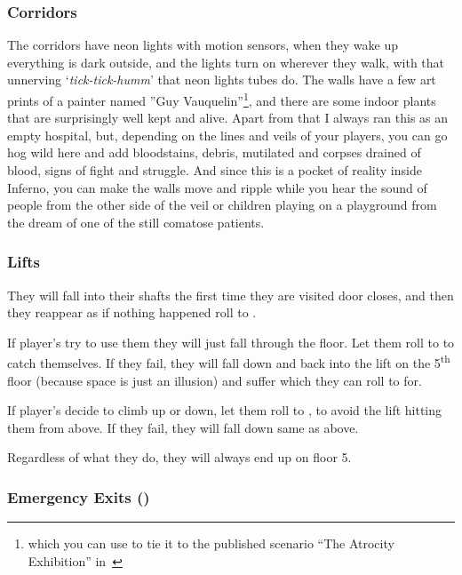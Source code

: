 \documentclass[bg-full]{resources/stylesheets/kult}
\begin{document}
\subsubsection{Corridors}%
\label{ssub:Corridors}
The corridors have neon lights with motion sensors, when they wake up everything is dark outside, and the lights turn on
wherever they walk, with that unnerving ‘\textit{tick-tick-humm}’ that neon lights tubes do.  The walls have a few art prints of
a painter named ”Guy Vauquelin”\footnote{which you can use to tie it to the published scenario “The Atrocity Exhibition”
in~\cite[p.~94]{KULT:taroticum}}, and there are some indoor plants that are surprisingly well kept and alive.  Apart from that
I always ran this as an empty hospital, but, depending on the lines and veils of your players, you can go hog wild here and add
bloodstains, debris, mutilated and corpses drained of blood, signs of fight and struggle.  And since this is a pocket of reality
inside Inferno, you can make the walls move and ripple while you hear the sound of people from the other side of the veil or
children playing on a playground from the dream of one of the still comatose patients.

\subsubsection{Lifts}%
\label{ssub:lifts}

They will fall into their shafts the first time they are visited door closes, and then they reappear as if nothing happened
roll to .

If player's try to use them they will just fall through the floor.  Let them roll to  to catch
themselves.  If they fail, they will fall down and back into the lift on the 5\textsuperscript{th} floor (because space is
just an illusion) and suffer  which they can roll to  for.

If player's decide to climb up or down, let them roll to , to avoid the lift hitting them from
above.  If they fail, they will fall down same as above.

Regardless of what they do, they will always end up on floor 5.

\subsubsection{Emergency Exits (\faLock)}%
\label{ssub:emergency_exits}
\end{document}
